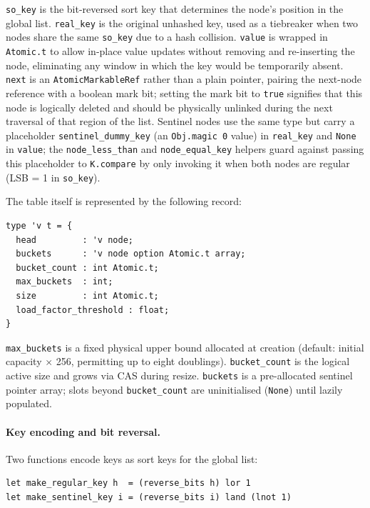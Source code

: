 \documentclass[11pt,a4paper]{article}
\begin{document}
\texttt{so\_key} is the bit-reversed sort key that determines the node's
position in the global list. \texttt{real\_key} is the original unhashed key,
used as a tiebreaker when two nodes share the same \texttt{so\_key} due to a
hash collision. \texttt{value} is wrapped in \texttt{Atomic.t} to allow
in-place value updates without removing and re-inserting the node, eliminating
any window in which the key would be temporarily absent. \texttt{next} is an
\texttt{AtomicMarkableRef} rather than a plain pointer, pairing the next-node
reference with a boolean mark bit; setting the mark bit to \texttt{true}
signifies that this node is logically deleted and should be physically unlinked
during the next traversal of that region of the list. Sentinel nodes use the
same type but carry a placeholder \texttt{sentinel\_dummy\_key} (an
\texttt{Obj.magic 0} value) in \texttt{real\_key} and \texttt{None} in
\texttt{value}; the \texttt{node\_less\_than} and \texttt{node\_equal\_key}
helpers guard against passing this placeholder to \texttt{K.compare} by only
invoking it when both nodes are regular (LSB = 1 in \texttt{so\_key}).

The table itself is represented by the following record:

\begin{verbatim}
type 'v t = {
  head         : 'v node;
  buckets      : 'v node option Atomic.t array;
  bucket_count : int Atomic.t;
  max_buckets  : int;
  size         : int Atomic.t;
  load_factor_threshold : float;
}
\end{verbatim}

\texttt{max\_buckets} is a fixed physical upper bound allocated at creation
(default: initial capacity $\times$ 256, permitting up to eight doublings).
\texttt{bucket\_count} is the logical active size and grows via CAS during
resize. \texttt{buckets} is a pre-allocated sentinel pointer array; slots
beyond \texttt{bucket\_count} are uninitialised (\texttt{None}) until lazily
populated.

\paragraph{Key encoding and bit reversal.}
Two functions encode keys as sort keys for the global list:

\begin{verbatim}
let make_regular_key h  = (reverse_bits h) lor 1
let make_sentinel_key i = (reverse_bits i) land (lnot 1)
\end{verbatim}
\end{document}
